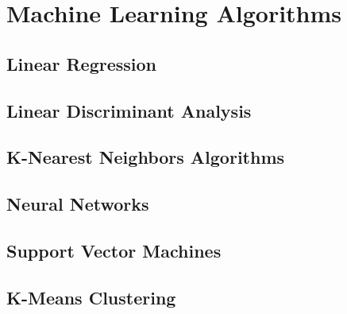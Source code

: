 \chapter{Machine Learning Algorithms}

\section{Linear Regression}

\section{Linear Discriminant Analysis}

\section{K-Nearest Neighbors Algorithms}

\section{Neural Networks}

\section{Support Vector Machines}

\section{K-Means Clustering}




